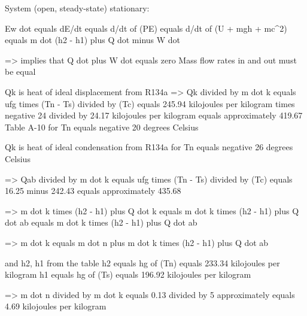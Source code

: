 System (open, steady-state) stationary:

Ew dot equals dE/dt equals d/dt of (PE) equals d/dt of (U + mgh + mc^2) equals m dot (h2 - h1) plus Q dot minus W dot

=> implies that Q dot plus W dot equals zero
Mass flow rates in and out must be equal

Qk is heat of ideal displacement from R134a
=> Qk divided by m dot k equals ufg times (Tn - Ts) divided by (Tc) equals 245.94 kilojoules per kilogram times negative 24 divided by 24.17 kilojoules per kilogram equals approximately 419.67
Table A-10 for Tn equals negative 20 degrees Celsius

Qk is heat of ideal condensation from R134a for Tn equals negative 26 degrees Celsius

=> Qab divided by m dot k equals ufg times (Tn - Ts) divided by (Tc) equals 16.25 minus 242.43 equals approximately 435.68

=> m dot k times (h2 - h1) plus Q dot k equals m dot k times (h2 - h1) plus Q dot ab equals m dot k times (h2 - h1) plus Q dot ab

=> m dot k equals m dot n plus m dot k times (h2 - h1) plus Q dot ab

and h2, h1 from the table
h2 equals hg of (Tn) equals 233.34 kilojoules per kilogram
h1 equals hg of (Ts) equals 196.92 kilojoules per kilogram

=> m dot n divided by m dot k equals 0.13 divided by 5 approximately equals 4.69 kilojoules per kilogram
